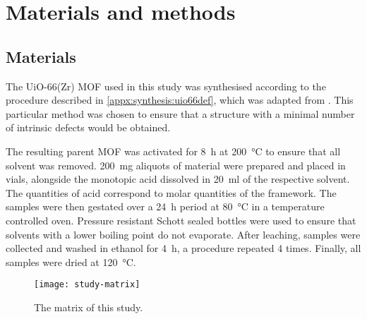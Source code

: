 
\section{Materials and methods}

\subsection{Materials}

The UiO-66(Zr) \gls{MOF} used in this study was synthesised according
to the procedure described in \autoref{appx:synthesis:uio66def},
which was adapted from \citet{shearerTunedPerfectionIroning2014}.
This particular method was chosen to ensure that a structure with
a minimal number of intrinsic defects would be obtained.

The resulting parent \gls{MOF} was activated for \SI{8}{\hour} at
\SI{200}{\degreeCelsius} to ensure that all solvent was removed.
\SI{200}{\milli\gram} aliquots of material were prepared and 
placed in vials, alongside the monotopic acid dissolved in
\SI{20}{\milli\litre} of the respective solvent. The quantities
of acid correspond to molar quantities of the framework.
The samples were then gestated over a \SI{24}{\hour} period
at \SI{80}{\degreeCelsius} in a temperature controlled oven.
Pressure resistant Schott sealed bottles were used to ensure that
solvents with a lower boiling point do not evaporate.
After leaching, samples were collected and washed in ethanol
for \SI{4}{\hour}, a procedure repeated 4 times. Finally, all 
samples were dried at \SI{120}{\degreeCelsius}.

\begin{figure}[htb]
	\centering
	\texttt{[image: study-matrix]}%
	\caption{The matrix of this study.
	}\label{def:fig:study-matrix}

\end{figure}

